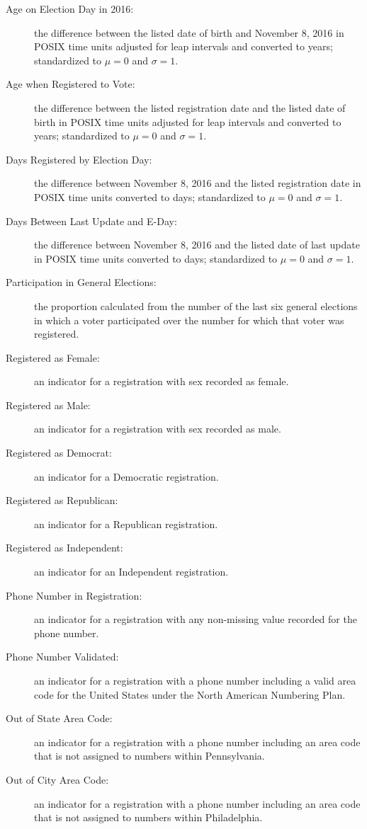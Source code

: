 \documentclass[12pt]{article}
\begin{document}
\begin{description}
\item [Age on Election Day in 2016:] the difference between the listed date of birth and November 8, 2016 in POSIX time units adjusted for leap intervals and converted to years; standardized to $\mu = 0$ and $\sigma = 1$.
\item [Age when Registered to Vote:] the difference between the listed registration date and the listed date of birth in POSIX time units adjusted for leap intervals and converted to years; standardized to $\mu = 0$ and $\sigma = 1$.
\item [Days Registered by Election Day:] the difference between November 8, 2016 and the listed registration date in POSIX time units converted to days; standardized to $\mu = 0$ and $\sigma = 1$.
\item [Days Between Last Update and E-Day:] the difference between November 8, 2016 and the listed date of last update in POSIX time units converted to days; standardized to $\mu = 0$ and $\sigma = 1$.
\item [Participation in General Elections:] the proportion calculated from the number of the last six general elections in which a voter participated over the number for which that voter was registered.
\item [Registered as Female:] an indicator for a registration with sex recorded as female.
\item [Registered as Male:] an indicator for a registration with sex recorded as male.
\item [Registered as Democrat:] an indicator for a Democratic registration.
\item [Registered as Republican:] an indicator for a Republican registration.
\item [Registered as Independent:] an indicator for an Independent registration.
\item [Phone Number in Registration:] an indicator for a registration with any non-missing value recorded for the phone number.
\item [Phone Number Validated:] an indicator for a registration with a phone number including a valid area code for the United States under the North American Numbering Plan.
\item [Out of State Area Code:] an indicator for a registration with a phone number including an area code that is not assigned to numbers within Pennsylvania.
\item [Out of City Area Code:] an indicator for a registration with a phone number including an area code that is not assigned to numbers within Philadelphia.
\end{description}
\end{document}
